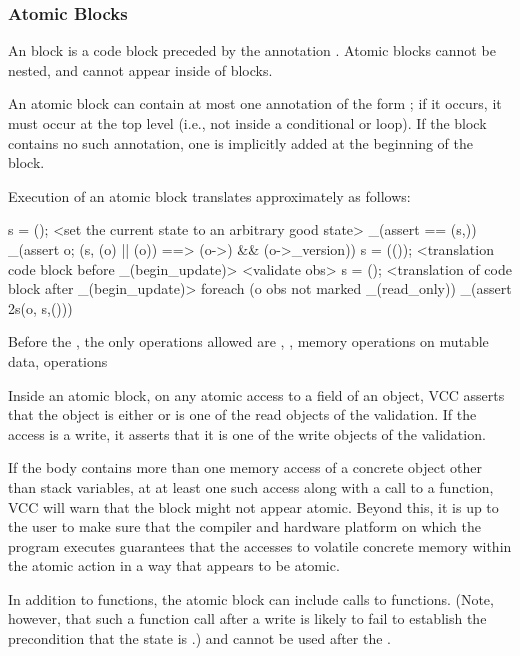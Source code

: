 \documentclass[preprint,nocopyrightspace]{sigplanconf}
\begin{document}
{{{\subsubsection{Atomic Blocks}

An  block is a code block preceded by the
annotation . Atomic blocks cannot be nested, and
cannot appear inside of  blocks. 

An atomic block can contain at most one annotation of the
form ; if it occurs, it must occur at the top
level (i.e., not inside a conditional or loop). If the block contains
no such annotation, one is implicitly added at the beginning of the
block. 

Execution of an atomic block translates approximately as follows:
\begin{VCC}
\state s = \now();
<set the current state to an arbitrary good state>
_(assert \me == \at(s,\me))
_(assert \forall \object o; \at(s, \wrapped(o) || \mutable(o))
    ==> \unchanged(o->\version) && \unchanged(o->\volatile_version))
s = \stutter(\now());
<translation code block before _(begin_update)>
<validate obs>
s = \now();
<translation of code block after _(begin_update)>
foreach (\object o \in obs not marked _(read_only))
  _(assert \inv2s(o, s,\now()))
\end{VCC}

Before the , the only operations allowed
are , , memory operations on mutable data,
 operations 

Inside an atomic block, on any atomic access to a field of an object,
VCC asserts that the object is either \vcc{\mutable} or is one of the
read objects of the validation. If the access is a write, it asserts
that it is one of the write objects of the validation.

If the body contains more than one memory access of a concrete object
other than stack variables, at at least one such access along with a
call to a  function, VCC will warn that the block might
not appear atomic. Beyond this, it is up to the user to make sure that the
compiler and hardware platform on which the program executes guarantees that 
the accesses to volatile concrete memory within the
atomic action in a way that appears to be atomic. 

In addition to  functions, the atomic block can
include calls to  functions. (Note, however, that such a
function call after a write is likely to fail to establish the
precondition that the state is .) 
and  cannot be used after the .

}}}
\end{document}
